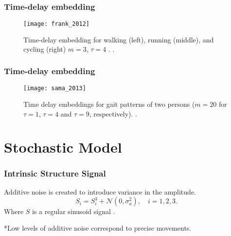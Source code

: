 \documentclass{beamer}
\begin{document}
\begin{frame}
\frametitle{Time-delay embedding}
\vspace{-0.7cm}


\begin{figure}[!htb]
\centering    
\texttt{[image: frank\_2012]}
\caption[PA]{Time-delay embedding for walking (left), running (middle), and cycling (right) $m=3$, $\tau=4$ . 
 \textcolor{red}{\textbf{ \cite{Frank2010,Frank2012} }}.
}  
\label{fig:sn}
\end{figure}



\end{frame}





\begin{frame}
\frametitle{Time-delay embedding}
\vspace{-0.7cm}


\begin{figure}[!htb]
\centering    
\texttt{[image: sama\_2013]}
\caption[PA]{Time delay embeddings for gait patterns of two persons ($m=20$ for $\tau=1$, $\tau=4$ and $\tau=9$, respectively). 
 \textcolor{red}{\textbf{ \cite{Sama2013} }}.
}  
\label{fig:sn}
\end{figure}



\end{frame}








\section{Stochastic Model}



\begin{frame}
\frametitle{Intrinsic Structure Signal}
\vspace{-0.7cm}

Additive noise is created to introduce variance in the amplitude.
\begin{equation}
 S_i = S_i^3 + \mathcal{N}( 0 , \sigma_a ^2), \quad  i = 1,2,3.
\end{equation}
Where $S$ is a regular sinusoid signal \textcolor{red}{\textbf{ \cite{Hammerla2011} }}.

*Low levels of additive noise correspond to precise movements.

\end{frame}
\end{document}
